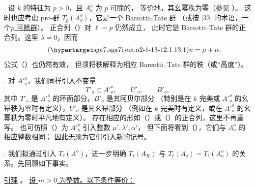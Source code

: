 \medskip
\noindent
{}. 设 $k$ 的特征为 $p>0$，且 $A_o^o$ 为 $p$ 可除的，
等价地，其幺幂秩为零（参见 ）。
这时也应考虑 pro-群 $T_p(A_o^o)$，它是一个 \underline{Barsotti--Tate 群}
（或按 [33] 的术语，一个\underline{$p$ 可除群}）。
正合列（）对 $\ell=p$ 仍然成立，
此时它是 Barsotti--Tate 群的正合列。这里 $\lambda=0$，因而
\begin{equation}\tag{\SGARefTarget{sga7.sga7i.eix.n2-1-13-1}{2.1.13.1}}
 n=\mu+\alpha.
\end{equation}
公式（）也仍然有效，
但须将秩解释为相应 Barsotti--Tate 群的秩（或“高度”）。

\medskip
\noindent
{}. 对 ${A'}_o^o$，我们同样引入不变量
\[
 T'_o\subset {A'}_o^o,\qquad U'_o,\qquad B'_o,
\]
其中 $T'_o$ 是 ${A'}_o^o$ 的环面部分，$B'_o$ 是其阿贝尔部分
（特别是在 $k$ 完美或 ${A'}_o^o$ 的幺幂秩为零时有定义），$U'_o$ 是其幺幂部分
（例如在 $k$ 完美时有定义，或在 ${A'}_o^o$ 的幺幂秩为零时平凡地有定义）。
存在相应的形如（）或（）的正合列，这里不再重写。
也可仿照（）为 ${A'}_o^o$ 引入整数 $\mu',\lambda',\alpha'$，
但下面将看到（），它们与 $A_o^o$ 的相应整数相同；
因此无须为它们引入新的记号。



\medskip
\noindent
{}. 我们拟通过引入 $T_\ell(A^o)$，进一步明确
$T_\ell(A_K)$ 与 $T_\ell(A_o)=T_\ell(A_o^o)$ 的关系。先回顾如下事实。

\medskip
\noindent
\underline{引理} 。
\underline{设 $m>0$ 为整数。以下条件等价：}

